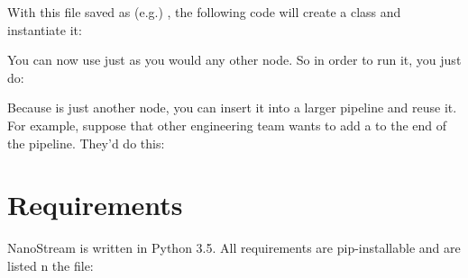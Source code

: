 \documentclass[letterpaper,10pt,english]{sphinxmanual}
\begin{document}
With this file saved as (e.g.) , the following code
will create a  class and instantiate it:

%
\begin{sphinxVerbatim}[commandchars=\\\{\}]
   
  
\end{sphinxVerbatim}

You can now use  just as you would any other node. So in
order to run it, you just do:

%
\begin{sphinxVerbatim}[commandchars=\\\{\}]
\end{sphinxVerbatim}

Because  is just another node, you can insert it into a
larger pipeline and reuse it. For example, suppose that other
engineering team wants to add a  to the end of the
pipeline. They’d do this:

%
\begin{sphinxVerbatim}[commandchars=\\\{\}]
  
  
\end{sphinxVerbatim}


\chapter{Requirements}
\label{\detokenize{requirements:requirements}}\label{\detokenize{requirements::doc}}
NanoStream is written in Python 3.5. All requirements are pip-installable and
are listed n the  file:
\end{document}
